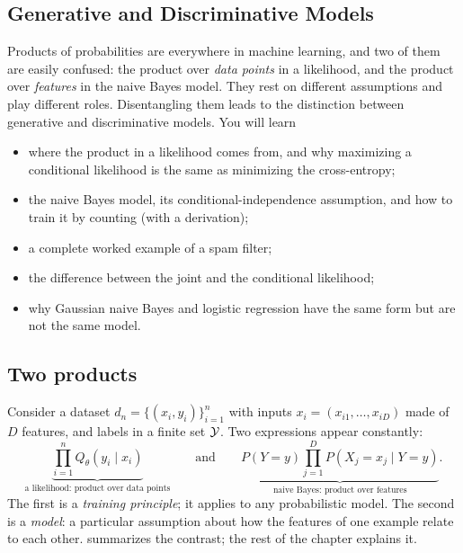 \begin{notechapter}
\chapter{Generative and Discriminative Models}\label{ch:generative-discriminative}

\begin{chapterintro}
Products of probabilities are everywhere in machine learning, and two of them
are easily confused: the product over \emph{data points} in a likelihood, and
the product over \emph{features} in the naive Bayes model. They rest on
different assumptions and play different roles. Disentangling them leads to
the distinction between generative and discriminative models. You will learn
\begin{itemize}[nosep]
  \item where the product in a likelihood comes from, and why maximizing a
        conditional likelihood is the same as minimizing the cross-entropy;
  \item the naive Bayes model, its conditional-independence assumption, and
        how to train it by counting (with a derivation);
  \item a complete worked example of a spam filter;
  \item the difference between the joint and the conditional likelihood;
  \item why Gaussian naive Bayes and logistic regression have the same form
        but are not the same model.
\end{itemize}
\end{chapterintro}

\section{Two products}\label{generative-discriminative:sec:two}

Consider a dataset $d_n = \{(x_i,y_i)\}_{i=1}^n$ with inputs
$x_i = (x_{i1},\dots,x_{iD})$ made of $D$ features, and labels in a finite set
$\mathcal{Y}$. Two expressions appear constantly:
\[
  \underbrace{\prod_{i=1}^n Q_\theta(y_i\mid x_i)}_{\text{a likelihood: product over data points}}
  \qquad\text{and}\qquad
  \underbrace{P(Y = y)\prod_{j=1}^D P(X_j = x_j\mid Y = y)}_{\text{naive Bayes: product over features}} .
\]
The first is a \emph{training principle}; it applies to any probabilistic
model. The second is a \emph{model}: a particular assumption about how the
features of one example relate to each other.
 summarizes the contrast; the rest
of the chapter explains it.


\end{notechapter}

